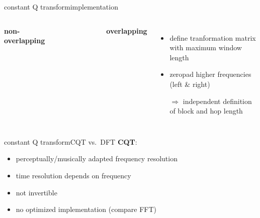         \begin{frame}{constant Q transform}{implementation}
            \begin{columns}
                    \vspace{-5mm}
                    \begin{center}\textbf{non-overlapping}\end{center}
                    \vspace{-8mm}
                    \begin{figure}
                        
                    \end{figure}
                    \vspace{-5mm}
                    \begin{center}\textbf{overlapping}\end{center}
                    \vspace{20mm}
                    \begin{itemize}
                        \item   define tranformation matrix with maximum window length
                        \item   zeropad higher frequencies (left \& right)
                        \item[$\Rightarrow$] independent definition of block and hop length
                    \end{itemize}
                    \vspace{15mm}
                \end{columns}
        \end{frame}	

        \begin{frame}{constant Q transform}{CQT vs.\ DFT}
            \textbf{CQT}:
            \bigskip
            \begin{itemize}
                \item<1->[+]	perceptually/musically adapted frequency resolution
                \smallskip
                \item<2->[--]	time resolution depends on frequency
                \smallskip
                \item<3->[--]	not invertible
                \smallskip
                \item<4->[--]	no optimized implementation (compare FFT)
            \end{itemize}
        \end{frame}	


